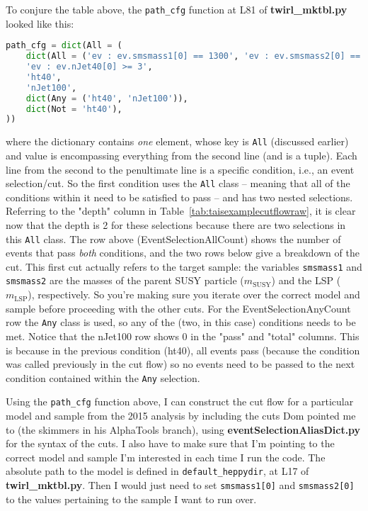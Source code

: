 To conjure the table above, the \texttt{path\_cfg} function at L81 of \textbf{twirl\_mktbl.py} looked like this:

\begin{lstlisting}[belowskip=-0.7cm, language=python, numbers=none]
path_cfg = dict(All = (
	dict(All = ('ev : ev.smsmass1[0] == 1300', 'ev : ev.smsmass2[0] == 1050')),
	'ev : ev.nJet40[0] >= 3',
	'ht40',
	'nJet100',
	dict(Any = ('ht40', 'nJet100')),
	dict(Not = 'ht40'),
))
\end{lstlisting}

where the dictionary contains \emph{one} element, whose key is \texttt{All} (discussed earlier) and value is encompassing everything from the second line (and is a tuple). Each line from the second to the penultimate line is a specific condition, i.e., an event selection/cut. So the first condition uses the \texttt{All} class -- meaning that all of the conditions within it need to be satisfied to pass -- and has two nested selections. Referring to the "depth" column in Table~\ref{tab:taisexamplecutflowraw}, it is clear now that the depth is 2 for these selections because there are two selections in this \texttt{All} class. The row above (EventSelectionAllCount) shows the number of events that pass \emph{both} conditions, and the two rows below give a breakdown of the cut. This first cut actually refers to the target sample: the variables \texttt{smsmass1} and \texttt{smsmass2} are the masses of the parent SUSY particle ($m_{\mathrm{SUSY}}$) and the LSP ($m_{\mathrm{LSP}}$), respectively. So you're making sure you iterate over the correct model and sample before proceeding with the other cuts. For the EventSelectionAnyCount row the \texttt{Any} class is used, so any of the (two, in this case) conditions needs to be met. Notice that the nJet100 row shows 0 in the "pass" and "total" columns. This is because in the previous condition (ht40), all events pass (because the condition was called previously in the cut flow) so no events need to be passed to the next condition contained within the \texttt{Any} selection.

Using the \texttt{path\_cfg} function above, I can construct the cut flow for a particular model and sample from the 2015 analysis by including the cuts Dom pointed me to (the skimmers in his AlphaTools branch), using \textbf{eventSelectionAliasDict.py} for the syntax of the cuts. I also have to make sure that I'm pointing to the correct model and sample I'm interested in each time I run the code. The absolute path to the model is defined in \texttt{default\_heppydir}, at L17 of \textbf{twirl\_mktbl.py}. Then I would just need to set \texttt{smsmass1[0]} and \texttt{smsmass2[0]} to the values pertaining to the sample I want to run over.

